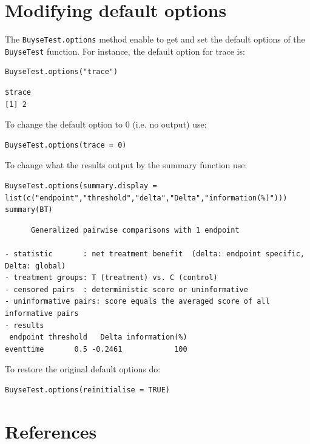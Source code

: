 \documentclass[12pt]{article}
\begin{document}
\section{Modifying default options}
\label{sec:orgb600a42}
The \texttt{BuyseTest.options} method enable to get and set the default
options of the \texttt{BuyseTest} function. For instance, the default option
for trace is:
\lstset{language=r,label= ,caption= ,captionpos=b,numbers=none}
\begin{lstlisting}
BuyseTest.options("trace")
\end{lstlisting}

\begin{verbatim}
$trace
[1] 2
\end{verbatim}


To change the default option to 0 (i.e. no output) use:
\lstset{language=r,label= ,caption= ,captionpos=b,numbers=none}
\begin{lstlisting}
BuyseTest.options(trace = 0)
\end{lstlisting}

To change what the results output by the summary function use:
\lstset{language=r,label= ,caption= ,captionpos=b,numbers=none}
\begin{lstlisting}
BuyseTest.options(summary.display = list(c("endpoint","threshold","delta","Delta","information(%)")))
summary(BT)
\end{lstlisting}

\begin{verbatim}
      Generalized pairwise comparisons with 1 endpoint

- statistic       : net treatment benefit  (delta: endpoint specific, Delta: global) 
- treatment groups: T (treatment) vs. C (control) 
- censored pairs  : deterministic score or uninformative
- uninformative pairs: score equals the averaged score of all informative pairs
- results
 endpoint threshold   Delta information(%)
eventtime       0.5 -0.2461            100
\end{verbatim}



To restore the original default options do:
\lstset{language=r,label= ,caption= ,captionpos=b,numbers=none}
\begin{lstlisting}
BuyseTest.options(reinitialise = TRUE)
\end{lstlisting}

\clearpage

\section*{References}
\label{sec:org76ccb00}
\begingroup
\renewcommand{\section}[2]{}




\endgroup
\end{document}
